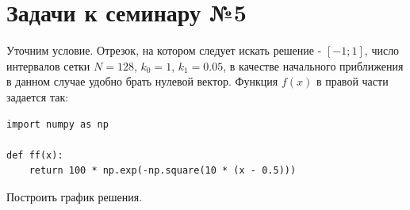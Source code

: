 \documentclass{article}
\begin{document}
\newpage

\section*{Задачи к семинару №5}
Уточним условие. Отрезок, на котором следует искать решение - $[-1; 1]$, число интервалов сетки $N = 128$, $k_0 = 1$, $k_1 = 0.05$, в качестве начального приближения в данном случае удобно брать нулевой вектор. Функция $f(x)$ в правой части задается так:
\begin{verbatim}
import numpy as np

def ff(x):
    return 100 * np.exp(-np.square(10 * (x - 0.5)))
\end{verbatim}
Построить график решения.
\end{document}
